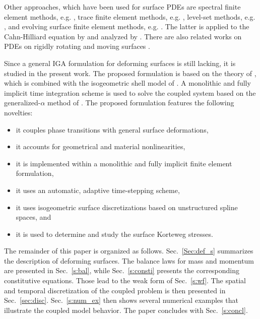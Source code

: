 \documentclass[11pt]{article}
\begin{document}
Other approaches, which have been used for surface PDEs are spectral finite element methods, e.g. \citet{taylor97}, trace finite element methods, e.g. \citet{reusken14}, level-set methods, e.g. \citet{sethian99,bertalimo01},
and evolving surface finite element methods, e.g. \citet{dziuk07,dziuk12}. The latter is applied to the Cahn-Hilliard equation by \citet{eilks08} and analyzed by \citet{elliott15}.
There are also related works on PDEs on rigidly rotating \citep{taylor97} and moving surfaces \citep{elliott09}.

Since a general IGA formulation for deforming surfaces is still lacking, it is studied in the present work.
The proposed formulation is based on the theory of \citet{sahu17}, which is combined with the isogeometric shell model of \citet{solidshell2}.
A monolithic and fully implicit time integration scheme is used to solve the coupled system based on the generalized-$\alpha$ method of \citet{chung93}. 
The proposed formulation features the following novelties:
\begin{itemize}
	\item it couples phase transitions with general surface deformations,
	\item it accounts for geometrical and material nonlinearities,
	\item it is implemented within a monolithic and fully implicit finite element formulation,
	\item it uses an automatic, adaptive time-stepping scheme,
	\item it uses isogeometric surface discretizations based on unstructured spline spaces, and
	\item it is used to determine and study the surface Korteweg stresses.
\end{itemize}

The remainder of this paper is organized as follows.
Sec.~\ref{Sec:def_s} summarizes the description of deforming surfaces. 
The balance laws for mass and momentum are presented in Sec.~\ref{s:bal}, while Sec.~\ref{s:consti} presents the corresponding constitutive equations. 
Those lead to the weak form of Sec.~\ref{s:wf}. 
The spatial and temporal discretization of the coupled problem is then presented in Sec.~\ref{sec:disc}. 
Sec.~\ref{s:num_ex} then shows several numerical examples that illustrate the coupled model behavior. 
The paper concludes with  Sec.~\ref{s:concl}.
\end{document}
